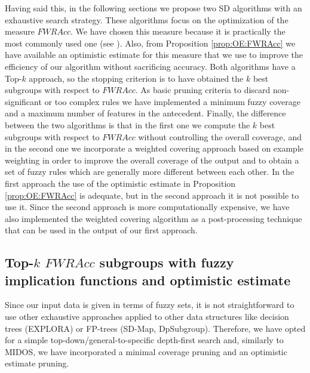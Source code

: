 Having said this, in the following sections we propose two SD algorithms with an exhaustive search strategy. These algorithms focus on the optimization of the measure $FWRAcc$. We have chosen this measure because it is practically the most commonly used one (see \cite{Atzmueller2015,Helal2016}). Also, from Proposition \ref{prop:OE:FWRAcc} we have available an optimistic estimate for this measure that we use to improve the efficiency of our algorithm without sacrificing accuracy. Both algorithms have a Top-$k$ approach, so the stopping criterion is to have obtained the $k$ best subgroups with respect to $FWRAcc$. As basic pruning criteria to discard non-significant or too complex rules we have implemented a minimum fuzzy coverage and a maximum number of features in the antecedent. Finally, the difference between the two algorithms is that in the first one we compute the $k$ best subgroups with respect to $FWRAcc$ without controlling the overall coverage, and in the second one we incorporate a weighted covering approach based on example weighting in order to improve the overall coverage of the output and to obtain a set of fuzzy rules which are generally more different between each other. In the first approach the use of the optimistic estimate in Proposition \ref{prop:OE:FWRAcc} is adequate, but in the second approach it is not possible to use it. Since the second approach is more computationally expensive, we have also implemented the weighted covering algorithm as a post-processing technique that can be used in the output of our first approach.

\subsection{Top-$k$ $FWRAcc$ subgroups with fuzzy implication functions and optimistic estimate}

Since our input data is given in terms of fuzzy sets, it is not straightforward to use other exhaustive approaches applied to other data structures like decision trees (EXPLORA) or FP-trees (SD-Map, DpSubgroup). Therefore, we have opted for a simple top-down/general-to-specific depth-first search and, similarly to MIDOS, we have incorporated a minimal coverage pruning and an optimistic estimate pruning. 

